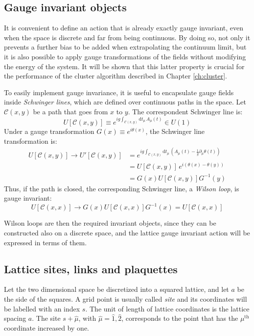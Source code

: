 \subsection*{Gauge invariant objects}

It is convenient to define an action that is already exactly gauge invariant, even when the space is discrete and far from being continuous.
By doing so, not only it prevents a further bias to be added when extrapolating the continuum limit,
but it is also possible to apply gauge transformations of the fields without modifying the energy of the system.
It will be shown that this latter property is crucial for the performance of the cluster algorithm described in Chapter \ref{ch:cluster}.

To easily implement gauge invariance, it is useful to encapsulate gauge fields inside \emph{Schwinger lines}, which are defined over continuous paths in the space.
Let $\mathcal C(x,y)$ be a path that goes from $x$ to $y$. The correspondent Schwinger line is:
\[
    U[\mathcal C(x,y)] \equiv e^{ig\int_{\mathcal C(x,y)}\mathrm dt_\mu\,A_\mu(t)} \in U(1)
\]
Under a gauge transformation $G(x) \equiv e^{i\theta(x)}$, the Schwinger line transformation is:
\begin{equation}\label{eq:path_gauge}
    \begin{aligned}
    U[\mathcal C(x,y)] \rightarrow U'[\mathcal C(x,y)] &= e^{ig\int_{\mathcal C(x,y)}\mathrm dt_\mu\,\left(A_\mu(t) - \frac{1}{g}\partial_\mu\theta(t)\right)} \\
                                                       &= U[\mathcal C(x,y)]\,e^{i(\theta(x) - \theta(y))} \\
                                                       &= G(x)U[\mathcal C(x,y)]G^{-1}(y)
    \end{aligned}
\end{equation}
Thus, if the path is closed, the corresponding Schwinger line, \ie a \emph{Wilson loop}, is gauge invariant:
\[
    U[\mathcal C(x,x)] \rightarrow G(x)U[\mathcal C(x,x)]G^{-1}(x) = U[\mathcal C(x,x)]
\]

Wilson loops are then the required invariant objects, since they can be constructed also on a discrete space,
and the lattice gauge invariant action will be expressed in terms of them.

\subsection*{Lattice sites, links and plaquettes}
Let the two dimensional space be discretized into a squared lattice, and let $a$ be the side of the squares.
A grid point is usually called \emph{site} and its coordinates will be labelled with an index $s$.
The unit of length of lattice coordinates is the lattice spacing $a$.
The site $s + \hat\mu$, with $\hat\mu = \hat1,\hat2$, corresponds to the point that has the $\mu^\mathrm{th}$ coordinate increased by one.

